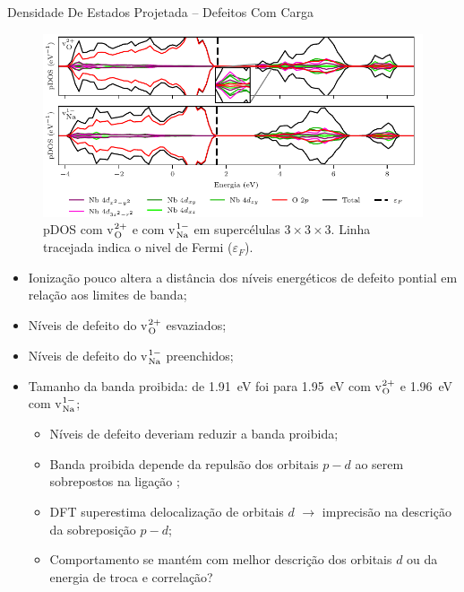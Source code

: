 \begin{frame}[allowframebreaks]{Densidade De Estados Projetada -- Defeitos Com Carga}
	\begin{figure}[t]
		\centering
		\includegraphics[scale=1]{../floats/pdos_vac/pdos_charged_d_separated_333.pdf}
		\caption{pDOS com v$_{\ce{O}}^{2+}$ e com v$_{\ce{Na}}^{1-}$ em supercélulas $3\times3\times3$. Linha tracejada indica o nivel de Fermi ($\varepsilon_F$).\label{fig:pdosChaVac}}
	\end{figure}\framebreak
	\begin{itemize}
		\item Ionização pouco altera a distância dos níveis energéticos de defeito pontial em relação aos limites de banda;
		\item Níveis de defeito do v${}_{\ce{O}}^{2+}$ esvaziados;
		\item Níveis de defeito do v${}_{\ce{Na}}^{1-}$ preenchidos;
		\item Tamanho da banda proibida: de \SI{1.91}{\electronvolt} foi para \SI{1.95}{\electronvolt} com v$_{\ce{O}}^{2+}$ e \SI{1.96}{\electronvolt} com v$_{\ce{Na}}^{1-}$;
		\begin{itemize}
			\item Níveis de defeito deveriam \alert{reduzir} a banda proibida;
			\item Banda proibida depende da repulsão dos orbitais $p-d$ ao serem sobrepostos na ligação ;
			\item DFT superestima delocalização de orbitais $d$ $\to$ imprecisão na descrição da sobreposição $p-d$;
			\item Comportamento se mantém com melhor descrição dos orbitais $d$ ou da energia de troca e correlação?
		\end{itemize}
	\end{itemize}
\end{frame}
